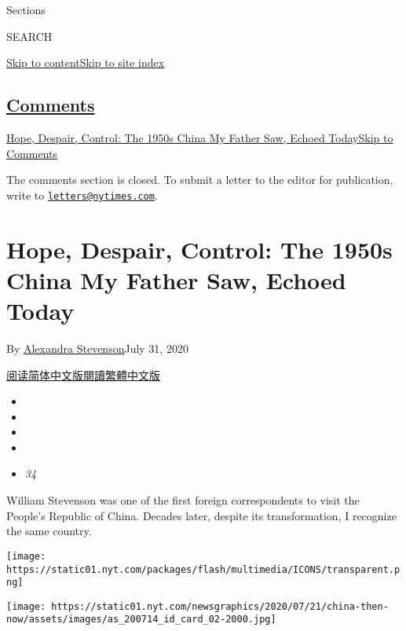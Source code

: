 Sections

SEARCH

\protect\hyperlink{site-content}{Skip to
content}\protect\hyperlink{site-index}{Skip to site index}

\hypertarget{comments}{%
\subsection{\texorpdfstring{\protect\hyperlink{commentsContainer}{Comments}}{Comments}}\label{comments}}

\href{}{Hope, Despair, Control: The 1950s China My Father Saw, Echoed
Today}\href{}{Skip to Comments}

The comments section is closed. To submit a letter to the editor for
publication, write to
\href{mailto:letters@nytimes.com}{\nolinkurl{letters@nytimes.com}}.

\hypertarget{hope-despair-control-the-1950s-china-my-father-saw-echoed-today}{%
\section{Hope, Despair, Control: The 1950s China My Father Saw, Echoed
Today}\label{hope-despair-control-the-1950s-china-my-father-saw-echoed-today}}

By \href{https://www.nytimes.com/by/alexandra-stevenson}{Alexandra
Stevenson}July 31, 2020

\href{https://cn.nytimes.com/china/20200731/china-1950s-echoed-today/}{阅读简体中文版}\href{https://cn.nytimes.com/china/20200731/china-1950s-echoed-today/zh-hant/}{閱讀繁體中文版}

\begin{itemize}
\item
\item
\item
\item
\item
  \emph{34}
\end{itemize}

William Stevenson was one of the first foreign correspondents to visit
the People's Republic of China. Decades later, despite its
transformation, I recognize the same country.

\texttt{[image: https://static01.nyt.com/packages/flash/multimedia/ICONS/transparent.png]}

\texttt{[image: https://static01.nyt.com/newsgraphics/2020/07/21/china-then-now/assets/images/as\_200714\_id\_card\_02-2000.jpg]}

